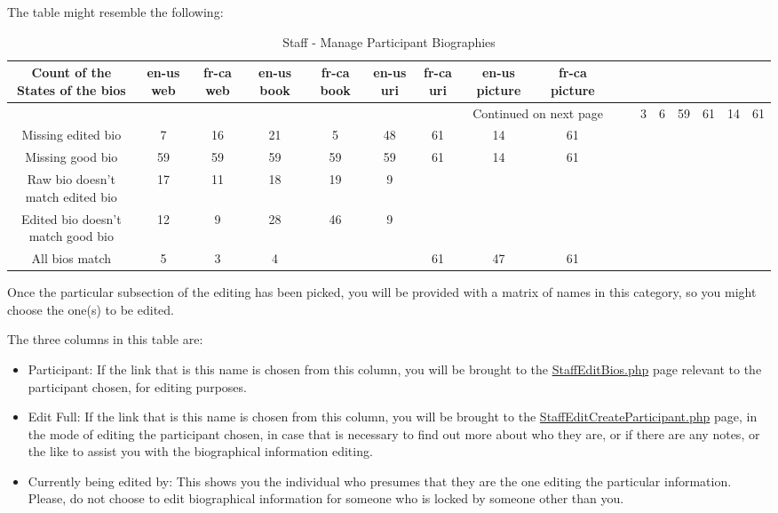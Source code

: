 \documentclass[tablesignature]{scrartcl}
\begin{document}
   The table might resemble the following:
\begin{longtable}{|c|c|c|c|c|c|c|c|c|}
\caption{Staff - Manage Participant Biographies} \label{tbl:staffmanageparticipantbiographies}\\
\hline
 Count of the States of the bios    &  en-us web  &  fr-ca web  &  en-us book  &  fr-ca book  &  en-us uri  &  fr-ca uri  &  en-us picture  &  fr-ca picture \\
\hline
\endhead
\hline\multicolumn{9}{r}{Continued on next page}\
\endfoot
\endlastfoot
\hline
 Missing raw bio                    &             &             &           3  &           6  &         59  &         61  &             14  &             61  \\
 Missing edited bio                 &          7  &         16  &          21  &           5  &         48  &         61  &             14  &             61  \\
 Missing good bio                   &         59  &         59  &          59  &          59  &         59  &         61  &             14  &             61  \\
 Raw bio doesn't match edited bio   &         17  &         11  &          18  &          19  &          9  &             &                 &                 \\
 Edited bio doesn't match good bio  &         12  &          9  &          28  &          46  &          9  &             &                 &                 \\
 All bios match                     &          5  &          3  &           4  &              &             &         61  &             47  &             61  \\
\hline
\end{longtable}


   Once the particular subsection of the editing has been picked, you
   will be provided with a matrix of names in this category, so you
   might choose the one(s) to be edited.

   The three columns in this table are:
\begin{itemize}
\item Participant: If the link that is this name is chosen from this
     column, you will be brought to the \hyperref[StaffEditBios.php]{StaffEditBios.php} page
     relevant to the participant chosen, for editing purposes.
\item Edit Full: If the link that is this name is chosen from this
     column, you will be brought to the \hyperref[StaffEditCreateParticipant.php]{StaffEditCreateParticipant.php}
     page, in the mode of editing the participant chosen, in case that
     is necessary to find out more about who they are, or if there are
     any notes, or the like to assist you with the biographical
     information editing.
\item Currently being edited by: This shows you the individual who
     presumes that they are the one editing the particular
     information.  Please, do not choose to edit biographical
     information for someone who is locked by someone other than you.
\end{itemize}
\end{document}
